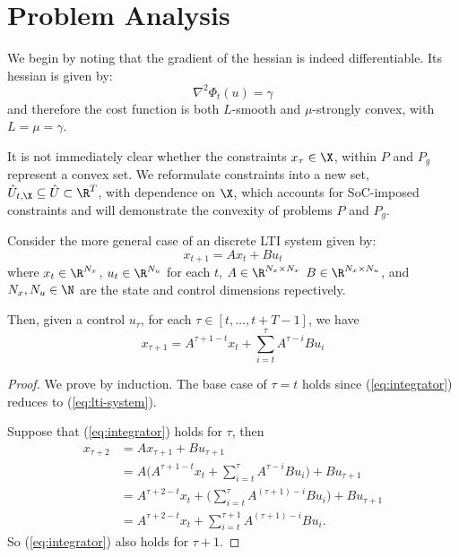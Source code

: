\documentclass{homework}
\begin{document}
\section{Problem Analysis}

We begin by noting that the gradient of the hessian is indeed differentiable.
Its hessian is given by:
\begin{equation*}
    \nabla^2 \Phi_t(u) = \gamma
\end{equation*}
and therefore the cost function is both $L$-smooth and $\mu$-strongly convex, with
$L = \mu = \gamma$.

It is not immediately clear whether the constraints $x_\tau\in\X$, within $P$ and $P_g$ represent
a convex set. We reformulate constraints into a new set, $\hat{U}_{t,\X}\subseteq \hat{U} \subset \R^T$,
with dependence on $\X$, which accounts for SoC-imposed constraints and
will demonstrate the convexity of problems $P$ and $P_g$.

Consider the more general case of an discrete LTI system given by:
\begin{equation}
    x_{t + 1} = A x_t + B u_t
    \label{eq:lti-system}
\end{equation}
where $x_t\in \R^{N_x}$, $u_t\in\R^{N_u}$ for each $t$, $A\in\R^{N_x \times N_x}$
$B \in \R^{N_x \times N_u}$, and $N_x,N_u\in\N$ are the state and control dimensions
repectively.

Then, given a control $u_\tau$, for each $\tau \in [t, \dots, t + T - 1]$, we have
\begin{equation}
    x_{\tau + 1} = A^{\tau + 1 - t} x_t + \sum_{i=t}^{\tau} A^{\tau - i} B u_i
    \label{eq:integrator}
\end{equation}

\begin{proof}
    We prove by induction. The base case of $\tau = t$ holds since
    (\ref{eq:integrator}) reduces to (\ref{eq:lti-system}).

    Suppose that (\ref{eq:integrator}) holds for $\tau$, then
    \begin{align*}
        x_{\tau + 2} &= A x_{\tau + 1} + Bu_{\tau + 1} \\
            &= A \biggl(
            A^{\tau + 1 - t} x_t + \sum_{i=t}^\tau A^{\tau - i} B u_i
        \biggr) + B u_{\tau + 1} \\
        &= A^{\tau + 2 - t} x_t + \biggl(\sum_{i=t}^\tau A^{(\tau + 1) - i} B u_i\biggr) + B u_{\tau + 1}\\
        &= A^{\tau + 2 - t} x_t + \sum_{i=t}^{\tau + 1} A^{(\tau + 1) - i} B u_i.
    \end{align*}
    So (\ref{eq:integrator}) also holds for $\tau + 1$.
\end{proof}
\end{document}
